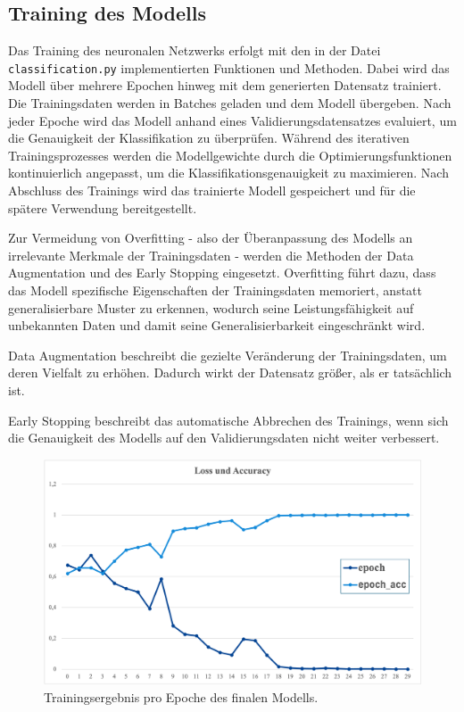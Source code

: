\documentclass[journal,twoside,web]{ieeecolor}
\begin{document}
\subsection{Training des Modells}
\label{sec:training}
Das Training des neuronalen Netzwerks erfolgt mit den in der Datei \texttt{classification.py} implementierten Funktionen und Methoden. Dabei wird das Modell über mehrere Epochen hinweg mit dem generierten Datensatz trainiert. Die Trainingsdaten werden in Batches geladen und dem Modell übergeben. Nach jeder Epoche wird das Modell anhand eines Validierungsdatensatzes evaluiert, um die Genauigkeit der Klassifikation zu überprüfen. Während des iterativen Trainingsprozesses werden die Modellgewichte durch die Optimierungsfunktionen kontinuierlich angepasst, um die Klassifikationsgenauigkeit zu maximieren. Nach Abschluss des Trainings wird das trainierte Modell gespeichert und für die spätere Verwendung bereitgestellt. 

Zur Vermeidung von Overfitting - also der Überanpassung des Modells an irrelevante Merkmale der Trainingsdaten - werden die Methoden der Data Augmentation und des Early Stopping eingesetzt. Overfitting führt dazu, dass das Modell spezifische Eigenschaften der Trainingsdaten memoriert, anstatt generalisierbare Muster zu erkennen, wodurch seine Leistungsfähigkeit auf unbekannten Daten und damit seine Generalisierbarkeit eingeschränkt wird.

Data Augmentation beschreibt die gezielte Veränderung der Trainingsdaten, um deren Vielfalt zu erhöhen. Dadurch wirkt der Datensatz größer, als er tatsächlich ist. 

Early Stopping beschreibt das automatische Abbrechen des Trainings, wenn sich die Genauigkeit des Modells auf den Validierungsdaten nicht weiter verbessert.


\begin{figure}[H]
    \centerline{\includegraphics[width=\columnwidth]{Trainingslog.png}}
    \caption{Trainingsergebnis pro Epoche des finalen Modells.}
    \label{fig:trainlog}
\end{figure}
\end{document}

